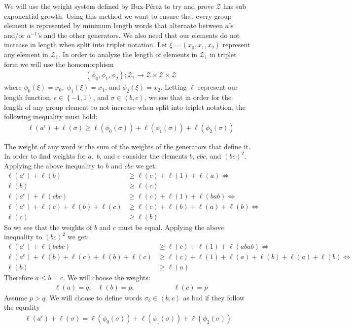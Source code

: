 \documentclass[11pt]{amsart}
\theoremstyle{definition}
\theoremstyle{remark}
\numberwithin{equation}{section}
\begin{document}
We will use the weight system defined by Bux-P\'{e}rez to try and prove $\mathcal{Z}$ has sub exponential growth.  Using this method we want to ensure that every group element is represented by minimum length words that alternate between $a$'s and/or $a^{-1}$'s and the other generators.  We also need that our elements do not increase in length when split into triplet notation.  Let $\xi=(x_0,x_1,x_2)$ represent any element in $\mathcal{Z}_1$.   In order to analyze the length of elements in $\mathcal{Z}_1$ in triplet form we will use the homomorphism 
\begin{align*}
&(\phi_0,\phi_1,\phi_2):\mathcal{Z}_1\rightarrow \mathcal{Z}\times\mathcal{Z}\times\mathcal{Z}
\end{align*}
where $\phi_0(\xi)=x_0,\;\phi_1(\xi)=x_1$, and $\phi_2(\xi)=x_2$.  Letting $\ell$ represent our length function, $\epsilon\in\left\{-1,1\right\}$, and $\sigma\in\left\langle b,c\right\rangle$, we see that in order for the length of any group element to not increase when split into triplet notation, the following inequality must hold:
\begin{align*}
& \ell(a^{\epsilon})+\ell(\sigma)\geq\ell(\phi_0(\sigma))+\ell(\phi_1(\sigma))+\ell(\phi_2(\sigma))
\end{align*}

The weight of any word is the sum of the weights of the generators that define it.  In order to find weights for $a,\;b$, and $c$ consider the elements $b$, $cbc$, and $(bc)^2$.  Applying the above inequality to $b$ and $cbc$ we get:
\begin{align*}
 \ell(a^{\epsilon})+\ell(b)&\geq\ell(c)+\ell(1)+\ell(a)\Leftrightarrow\\
 \ell(b)&\geq\ell(c)\\
 \ell(a^{\epsilon})+\ell(cbc)&\geq\ell(c)+\ell(1)+\ell(bab)\Leftrightarrow\\
 \ell(a^{\epsilon})+\ell(c)+\ell(b)+\ell(c)&\geq\ell(c)+\ell(b)+\ell(a)+\ell(b)\Leftrightarrow\\
 \ell(c)&\geq\ell(b)
\end{align*}
So we see that the weights of $b$ and $c$ must be equal.  Applying the above inequality to $(bc)^2$ we get:  
\begin{align*}
 \ell(a^{\epsilon})+\ell(bcbc)&\geq\ell(c)+\ell(1)+\ell(abab)\Leftrightarrow\\
 \ell(a^{\epsilon})+\ell(b)+\ell(c)+\ell(b)+\ell(c)&\geq\ell(c)+\ell(1)+\ell(a)+\ell(b)+\ell(a)+\ell(b)\Leftrightarrow\\
 \ell(b)&\geq\ell(a)
\end{align*}
Therefore $a\leq b=c$. We will choose the weights:
\begin{align*}
& \ell(a)=q, &\ell(b)=p,\hspace{2cm} &\ell(c)=p
\end{align*}
Assume $p>q$.  We will choose to define words $\sigma_b\in\left\langle b,c\right\rangle$ as bad if they follow the equality 
\begin{align*}
\ell(a^{\epsilon})+\ell(\sigma)=\ell(\phi_0(\sigma))+\ell(\phi_1(\sigma))+\ell(\phi_2(\sigma))
\end{align*}
\end{document}
